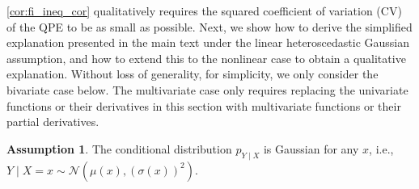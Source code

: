 \documentclass{article}
\theoremstyle{plain}
\theoremstyle{definition}
\newtheorem{assumption}[theorem]{Assumption}
\theoremstyle{remark}
\begin{document}
\cref{cor:fi_ineq_cor} qualitatively requires the squared coefficient of variation (CV) of the QPE to be as small as possible. Next, we show how to derive the simplified explanation presented in the main text under the linear heteroscedastic Gaussian assumption, and how to extend this to the nonlinear case to obtain a qualitative explanation. Without loss of generality, for simplicity, we only consider the bivariate case below. The multivariate case only requires replacing the univariate functions or their derivatives in this section with multivariate functions or their partial derivatives.

\begin{assumption}
\label{assum:heteroscedastic}
The conditional distribution $p_{Y\mid X}$ is Gaussian for any $x$, i.e., $Y\!\mid\!X=x\sim\mathcal{N}(\mu(x),(\sigma(x))^2)$.
\end{assumption}
\end{document}
